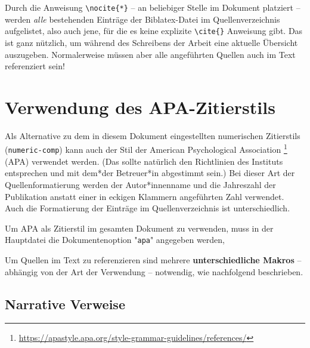 Durch die Anweisung \verb!\nocite{*}! -- an beliebiger Stelle im Dokument
platziert -- werden \emph{alle} bestehenden Einträge der Biblatex-Datei im
Quellenverzeichnis aufgelistet, also auch jene, für die es keine explizite
\verb!\cite{}! Anweisung gibt. Das ist ganz nützlich, um während des
Schreibens der Arbeit eine aktuelle Übersicht auszugeben. Normalerweise
müssen aber alle angeführten Quellen auch im Text referenziert sein!


\section{Verwendung des APA-Zitierstils}

\begin{sloppypar}
Als Alternative zu dem in diesem Dokument eingestellten numerischen
Zitierstils (\texttt{numeric-comp}) kann auch der Stil der American
Psychological Association%
\footnote{\url{https://apastyle.apa.org/style-grammar-guidelines/references/}}
(APA) verwendet werden. (Das sollte natürlich den Richtlinien des Instituts
entsprechen und mit dem*der Betreuer*in abgestimmt sein.) Bei dieser Art der
Quellenformatierung werden der Autor*innenname und die Jahreszahl der
Publikation anstatt einer in eckigen Klammern angeführten Zahl verwendet.
Auch die Formatierung der Einträge im Quellenverzeichnis ist unterschiedlich.
\end{sloppypar}

Um APA als Zitierstil im gesamten Dokument zu verwenden, muss in der
Hauptdatei die Dokumenten\-option "\texttt{apa}" angegeben werden, \zB
%
%
Um Quellen im Text zu referenzieren sind mehrere \textbf{unterschiedliche
Makros} -- abhängig von der Art der Verwendung -- notwendig, wie nachfolgend
beschrieben.


\subsection{Narrative Verweise}

